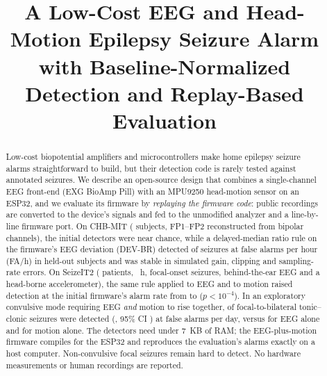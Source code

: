 \documentclass[conference,letterpaper]{IEEEtran}
\begin{document}
\title{A Low-Cost EEG and Head-Motion Epilepsy Seizure Alarm with Baseline-Normalized Detection and Replay-Based Evaluation}

\author{
\and
{}
}

\maketitle

\begin{abstract}
Low-cost biopotential amplifiers and microcontrollers make home epilepsy seizure alarms straightforward to build, but their detection code is rarely tested against annotated seizures. We describe an open-source design that combines a single-channel EEG front-end (EXG BioAmp Pill) with an MPU9250 head-motion sensor on an ESP32, and we evaluate its firmware by \emph{replaying the firmware code}: public recordings are converted to the device's signals and fed to the unmodified analyzer and a line-by-line firmware port. On CHB-MIT (\NSubj{} subjects, FP1--FP2 reconstructed from bipolar channels), the initial detectors were near chance, while a delayed-median ratio rule on the firmware's EEG deviation (DEV-BR) detected \DevASens{} of seizures at \DevAFAh{} false alarms per hour (FA/h) in held-out subjects and was stable in simulated gain, clipping and sampling-rate errors. On SeizeIT2 (\SNSubj{} patients, \SHours{}~h, \SNSz{} focal-onset seizures, behind-the-ear EEG and a head-borne accelerometer), the same rule applied to EEG and to motion raised detection at the initial firmware's alarm rate from \SFwSens{} to \SFusFwSens{} ($p{<}10^{-4}$). In an exploratory convulsive mode requiring EEG \emph{and} motion to rise together, \AvCoADet{} of \AvCoAN{} focal-to-bilateral tonic--clonic seizures were detected (\AvCoASens{}, 95\% CI \AvCoACI{}) at \AvCoAFAday{} false alarms per day, versus \AvEgASens{} for EEG alone and \AvMvASens{} for motion alone. The detectors need under 7~KB of RAM; the EEG-plus-motion firmware compiles for the ESP32 and reproduces the evaluation's alarms exactly on a host computer. Non-convulsive focal seizures remain hard to detect. No hardware measurements or human recordings are reported.
\end{abstract}
\end{document}
